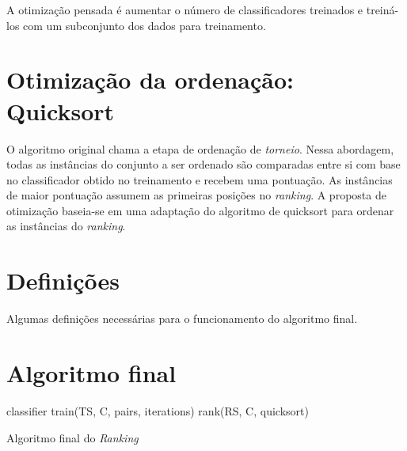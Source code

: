 A otimização pensada é aumentar o número de classificadores treinados e treiná-los com um subconjunto dos dados para treinamento.

\section{Otimização da ordenação: Quicksort}
O algoritmo original chama a etapa de ordenação de \emph{torneio}. Nessa abordagem, todas as instâncias do conjunto a ser ordenado são comparadas entre si com base no classificador obtido no treinamento e recebem uma pontuação. As instâncias de maior pontuação assumem as primeiras posições no \emph{ranking}. A proposta de otimização baseia-se em uma adaptação do algoritmo de quicksort para ordenar as instâncias do \emph{ranking}.

\section{Definições}
Algumas definições necessárias para o funcionamento do algoritmo final.

\section{Algoritmo final}

\begin{algorithm}
\begin{algorithmic}

\STATE classifier \gets train(TS, C, pairs, iterations)
\STATE rank(RS, C, quicksort)

\caption{Algoritmo final do \emph{Ranking}}
\label{alg:ranking}

\end{algorithmic}
\end{algorithm}
